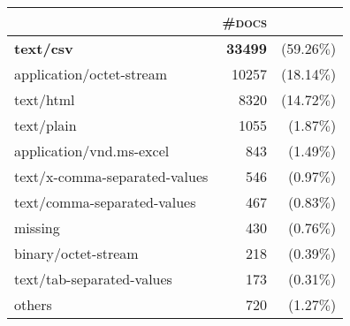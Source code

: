 \begin{tabular}{lrr} 
 \toprule 
 & \textsc{\#docs} & \\ 
 \midrule 
\textbf{text/csv}&\textbf{33499 }&(59.26$\%$)\\ 
  application/octet-stream&10257 &(18.14$\%$)\\ 
  text/html&8320 &(14.72$\%$)\\ 
  text/plain&1055 &(1.87$\%$)\\ 
  application/vnd.ms-excel&843 &(1.49$\%$)\\ 
  text/x-comma-separated-values&546 &(0.97$\%$)\\ 
  text/comma-separated-values&467 &(0.83$\%$)\\ 
  missing&430 &(0.76$\%$)\\ 
  binary/octet-stream&218 &(0.39$\%$)\\ 
  text/tab-separated-values&173 &(0.31$\%$)\\ 
  \bottomrule 
others&720 &(1.27$\%$)\\ 
  \bottomrule 
 \end{tabular}